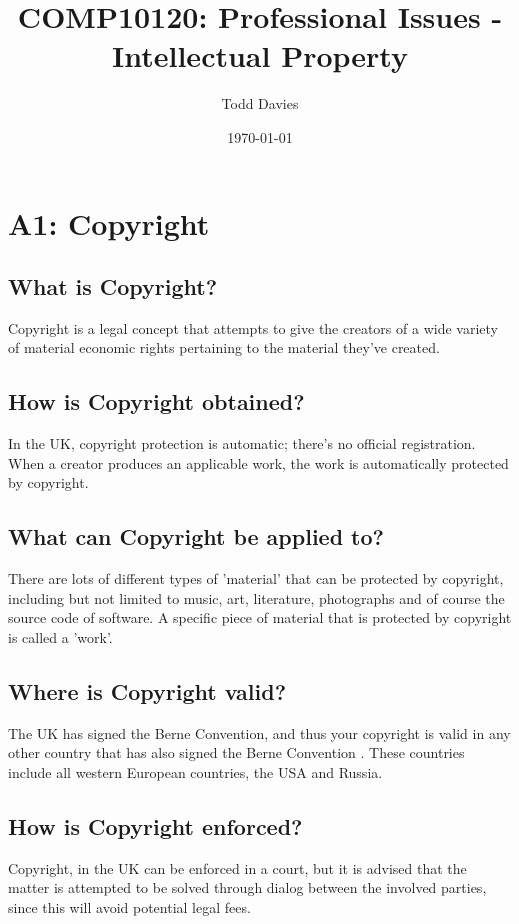 \documentclass{article}
\author{Todd Davies}
\title{COMP10120: Professional Issues - Intellectual Property}
\date{\today}
\begin{document}
\lhead{\today}

\maketitle

\section{A1: Copyright}

\subsection{What is Copyright?}
Copyright is a legal concept that attempts to give the creators of a wide variety of material economic rights pertaining to the material they've created. \cite{govukwhatis}

\subsection{How is Copyright obtained?}
In the UK, copyright protection is automatic; there's no official registration. When a creator produces an applicable work, the work is automatically protected by copyright. \cite{govukautoprotect}

\subsection{What can Copyright be applied to?}
There are lots of different types of 'material' that can be protected by copyright, including but not limited to music, art, literature, photographs and of course the source code of software. A specific piece of material that is protected by copyright is called a 'work'.

\subsection{Where is Copyright valid?}
The UK has signed the Berne Convention, and thus your copyright is valid in any other country that has also signed the Berne Convention \cite{berneconvention}. These countries include all western European countries, the USA and Russia. \cite{govukabroad}

\subsection{How is Copyright enforced?}
Copyright, in the UK can be enforced in a court, but it is advised that the matter is attempted to be solved through dialog between the involved parties, since this will avoid potential legal fees. \cite{govukenforce}
\end{document}
